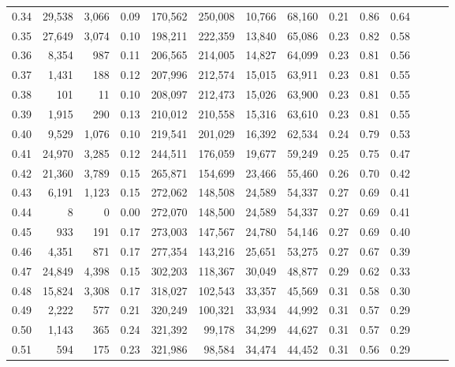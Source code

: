 \begin{tabular}{rrrrrrrrrrrrrr}
0.34 &  29,538 &  3,066 &  0.09 &  170,562 &  250,008 &  10,766 &  68,160 &  0.21 &  0.86 &      0.64 \\
0.35 &  27,649 &  3,074 &  0.10 &  198,211 &  222,359 &  13,840 &  65,086 &  0.23 &  0.82 &      0.58 \\
0.36 &   8,354 &    987 &  0.11 &  206,565 &  214,005 &  14,827 &  64,099 &  0.23 &  0.81 &      0.56 \\
0.37 &   1,431 &    188 &  0.12 &  207,996 &  212,574 &  15,015 &  63,911 &  0.23 &  0.81 &      0.55 \\
0.38 &     101 &     11 &  0.10 &  208,097 &  212,473 &  15,026 &  63,900 &  0.23 &  0.81 &      0.55 \\
0.39 &   1,915 &    290 &  0.13 &  210,012 &  210,558 &  15,316 &  63,610 &  0.23 &  0.81 &      0.55 \\
0.40 &   9,529 &  1,076 &  0.10 &  219,541 &  201,029 &  16,392 &  62,534 &  0.24 &  0.79 &      0.53 \\
0.41 &  24,970 &  3,285 &  0.12 &  244,511 &  176,059 &  19,677 &  59,249 &  0.25 &  0.75 &      0.47 \\
0.42 &  21,360 &  3,789 &  0.15 &  265,871 &  154,699 &  23,466 &  55,460 &  0.26 &  0.70 &      0.42 \\
0.43 &   6,191 &  1,123 &  0.15 &  272,062 &  148,508 &  24,589 &  54,337 &  0.27 &  0.69 &      0.41 \\
0.44 &       8 &      0 &  0.00 &  272,070 &  148,500 &  24,589 &  54,337 &  0.27 &  0.69 &      0.41 \\
0.45 &     933 &    191 &  0.17 &  273,003 &  147,567 &  24,780 &  54,146 &  0.27 &  0.69 &      0.40 \\
0.46 &   4,351 &    871 &  0.17 &  277,354 &  143,216 &  25,651 &  53,275 &  0.27 &  0.67 &      0.39 \\
0.47 &  24,849 &  4,398 &  0.15 &  302,203 &  118,367 &  30,049 &  48,877 &  0.29 &  0.62 &      0.33 \\
0.48 &  15,824 &  3,308 &  0.17 &  318,027 &  102,543 &  33,357 &  45,569 &  0.31 &  0.58 &      0.30 \\
0.49 &   2,222 &    577 &  0.21 &  320,249 &  100,321 &  33,934 &  44,992 &  0.31 &  0.57 &      0.29 \\
0.50 &   1,143 &    365 &  0.24 &  321,392 &   99,178 &  34,299 &  44,627 &  0.31 &  0.57 &      0.29 \\
0.51 &     594 &    175 &  0.23 &  321,986 &   98,584 &  34,474 &  44,452 &  0.31 &  0.56 &      0.29 \\

\end{tabular}
